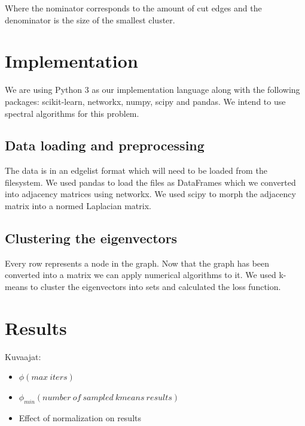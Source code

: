 \documentclass{article}
\begin{document}
Where the nominator corresponds to the amount of cut edges and the denominator is the size of the smallest cluster. 

\section{Implementation} %

We are using Python 3 as our implementation language along with the following packages: scikit-learn, networkx, numpy, scipy and pandas. We intend to use spectral algorithms for this problem.

\subsection{Data loading and preprocessing}

The data is in an edgelist format which will need to be loaded from the filesystem. We used pandas to load the files as DataFrames which we converted into adjacency matrices using networkx. We used scipy to morph the adjacency matrix into a normed Laplacian matrix.
	

\subsection{Clustering the eigenvectors}

Every row represents a node in the graph. Now that the graph has been converted into a matrix we can apply numerical algorithms to it. We used k-means to cluster the eigenvectors into sets and calculated the loss function.

\section{Results}
Kuvaajat: 
\begin{itemize}
	\item ${\phi(max\ iters)}$
	\item ${\phi_{min}(number\ of\ sampled\ kmeans\ results)}$
	\item Effect of normalization on results
\end{itemize}
\end{document}
